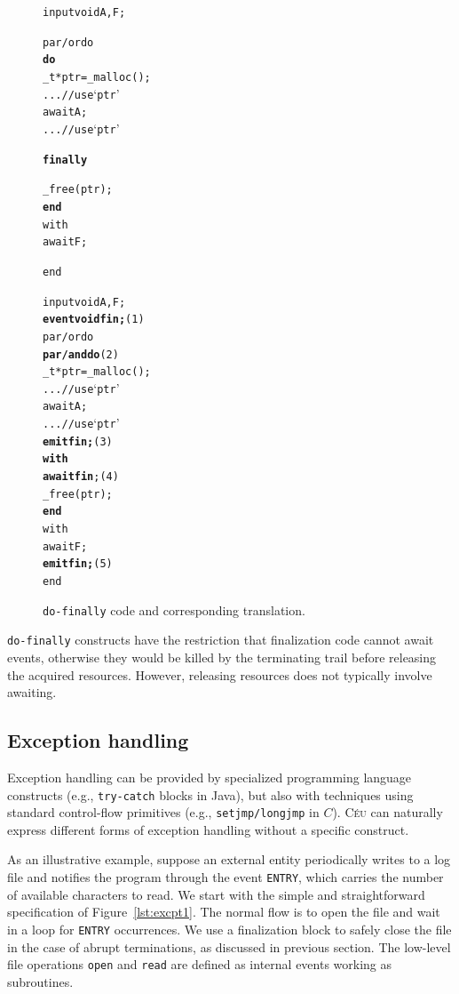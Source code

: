 \documentclass[preprint]{sigplanconf}
\newcommand{\CEU}{\textsc{C\'{e}u}\xspace}
\newcommand{\code}[1] {{\small{\texttt{#1}}}}
\newcommand{\DOFIN}{\code{do-finally}\xspace}
\newcommand{\1}{\;}
\newcommand{\2}{\;\;}
\newcommand{\3}{\;\;\;}
\newcommand{\5}{\;\;\;\;\;}
\begin{document}
\begin{figure}[t]
{\small
\begin{minipage}[t]{0.45\linewidth}
\begin{alltt}
  input void A,F;

  par/or do
    \textbf{do}
      \_t* ptr = \_malloc();
      ... // use `ptr'
      await A;
      ... // use `ptr'

    \textbf{finally}

      \_free(ptr);
    \textbf{end}
  with
    await F;

  end
\end{alltt}
\end{minipage}
%
\hspace{0.5cm}
%
\begin{minipage}[t]{0.45\linewidth}
\begin{alltt}
input void A,F;
\textbf{event void fin;}      (1)
par/or do
  \textbf{par/and do}          (2)
    \_t* ptr = \_malloc();
    ... // use `ptr'
    await A;
    ... // use `ptr'
    \textbf{emit fin;}        (3)
  \textbf{with}
    \textbf{await fin};       (4)
    \_free(ptr);
  \textbf{end}
with
  await F;
  \textbf{emit fin;}          (5)
end
\end{alltt}
\end{minipage}

\caption{ \DOFIN code and corresponding translation.
\label{lst:finally}
}
}
\end{figure}


\DOFIN constructs have the restriction that finalization code cannot await 
events, otherwise they would be killed by the terminating trail before 
releasing the acquired resources.
However, releasing resources does not typically involve awaiting.

\subsection{Exception handling}
\label{sec.adv.excpt}

Exception handling can be provided by specialized programming language 
constructs (e.g., \code{try-catch} blocks in Java), but also with techniques 
using standard control-flow primitives (e.g., \code{setjmp/longjmp} in $C$).
\CEU can naturally express different forms of exception handling without a 
specific construct.

As an illustrative example, suppose an external entity periodically writes to a 
log file and notifies the program through the event \code{ENTRY}, which carries 
the number of available characters to read.
We start with the simple and straightforward specification of 
Figure~\ref{lst:excpt1}.
The normal flow is to open the file and wait in a loop for \code{ENTRY} 
occurrences.
We use a finalization block to safely close the file in the case of abrupt 
terminations, as discussed in previous section.
The low-level file operations \code{open} and \code{read} are defined as 
internal events working as subroutines.
\end{document}
